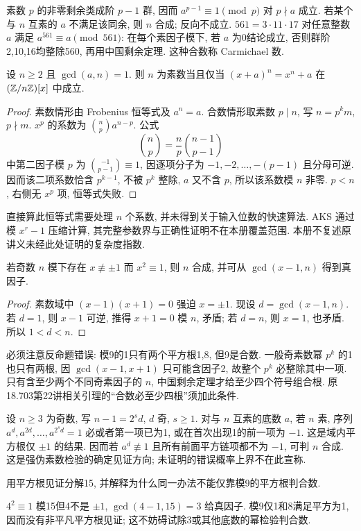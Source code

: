 素数 $p$ 的非零剩余类成阶 $p-1$ 群, 因而 $a^{p-1}\equiv1\pmod p$ 对 $p\nmid a$ 成立. 若某个与 $n$ 互素的 $a$ 不满足该同余, 则 $n$ 合成; 反向不成立. $561=3\cdot11\cdot17$ 对任意整数 $a$ 满足 $a^{561}\equiv a\pmod{561}$: 在每个素因子模下, 若 $a$ 为0结论成立, 否则群阶2,10,16均整除560, 再用中国剩余定理. 这种合数称 Carmichael 数.
\begin{proposition}
设 $n\ge2$ 且 $\gcd(a,n)=1$. 则 $n$ 为素数当且仅当 $(x+a)^n=x^n+a$ 在 $(\mathbb Z/n\mathbb Z)[x]$ 中成立.
\end{proposition}
\begin{proof}
素数情形由 Frobenius 恒等式及 $a^n=a$. 合数情形取素数 $p\mid n$, 写 $n=p^km$, $p\nmid m$. $x^p$ 的系数为 $\binom np a^{n-p}$. 公式
\[
\binom np=\frac np\binom{n-1}{p-1}
\]
中第二因子模 $p$ 为 $\binom{-1}{p-1}\equiv1$, 因逐项分子为 $-1,-2,\ldots,-(p-1)$ 且分母可逆. 因而该二项系数恰含 $p^{k-1}$, 不被 $p^k$ 整除, $a$ 又不含 $p$, 所以该系数模 $n$ 非零. $p<n$, 右侧无 $x^p$ 项, 恒等式失败.
\end{proof}
直接算此恒等式需要处理 $n$ 个系数, 并未得到关于输入位数的快速算法. AKS 通过模 $x^r-1$ 压缩计算, 其完整参数界与正确性证明不在本册覆盖范围. 本册不复述原讲义未经此处证明的复杂度指数.
\begin{proposition}
若奇数 $n$ 模下存在 $x\not\equiv\pm1$ 而 $x^2\equiv1$, 则 $n$ 合成, 并可从 $\gcd(x-1,n)$ 得到真因子.
\end{proposition}
\begin{proof}
素数域中 $(x-1)(x+1)=0$ 强迫 $x=\pm1$. 现设 $d=\gcd(x-1,n)$. 若 $d=1$, 则 $x-1$ 可逆, 推得 $x+1=0$ 模 $n$, 矛盾; 若 $d=n$, 则 $x=1$, 也矛盾. 所以 $1<d<n$.
\end{proof}
必须注意反命题错误: 模9的1只有两个平方根1,8, 但9是合数. 一般奇素数幂 $p^k$ 的1也只有两根, 因 $\gcd(x-1,x+1)$ 只可能含因子2, 故整个 $p^k$ 必整除其中一项. 只有含至少两个不同奇素因子的 $n$, 中国剩余定理才给至少四个符号组合根. 原18.703第22讲相关引理的“合数必至少四根”须加此条件.

设 $n\ge3$ 为奇数, 写 $n-1=2^sd$, $d$ 奇, $s\ge1$. 对与 $n$ 互素的底数 $a$, 若 $n$ 素, 序列 $a^d,a^{2d},\ldots,a^{2^sd}=1$ 必或者第一项已为1, 或在首次出现1的前一项为 $-1$. 这是域内平方根仅 $\pm1$ 的结果. 因而若 $a^d\not\equiv1$ 且所有前面平方链项都不为 $-1$, 可判 $n$ 合成. 这是强伪素数检验的确定见证方向; 未证明的错误概率上界不在此宣称.
\begin{exercise}用平方根见证分解15, 并解释为什么同一办法不能仅靠模9的平方根判合数.\end{exercise}
\begin{solution}
$4^2\equiv1$ 模15但4不是 $\pm1$, $\gcd(4-1,15)=3$ 给真因子. 模9仅1和8满足平方为1, 因而没有非平凡平方根见证; 这不妨碍试除3或其他底数的幂检验判合数.
\end{solution}
